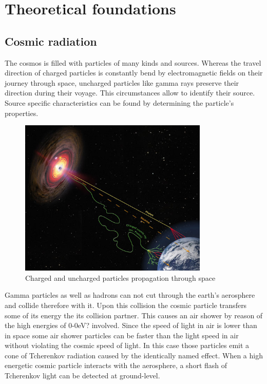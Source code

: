 \chapter{Theoretical foundations}


\section{Cosmic radiation}
The cosmos is filled with particles of many kinds and sources.
Whereas the travel direction of charged particles is constantly bend by electromagnetic fields on their journey through space,
uncharged particles like gamma rays preserve their direction during their voyage.
This circumstances allow to identify their source.
Source specific characteristics can be found by determining the particle's properties.

\begin{figure}
    \centering
    \includegraphics[width=9cm]{Plots/cosmic_ray.jpg}
    \caption{Charged and uncharged particles propagation through space}
    \label{fig:cosmic_ray}
\end{figure}

Gamma particles as well as hadrons can not cut through the earth's aerosphere and collide therefore with it.
Upon this collision the cosmic particle transfers some of its energy the its collision partner.
This causes an air shower by reason of the high energies of 0-0eV? involved.
Since the speed of light in air is lower than in space some air shower particles can be faster than the light speed in air
without violating the cosmic speed of light.
In this case those particles emit a cone of Tcherenkov radiation caused by the identically named effect.
When a high energetic cosmic particle interacts with the aerosphere, a short flash of Tcherenkov light can be detected at ground-level.

